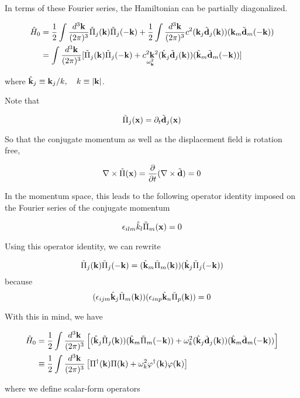 In terms of these Fourier series, the Hamiltonian can be partially diagonalized.

\[\begin{split}
\hat{H}_0 &= \frac{1}{2}\int\frac{d^3{\bf k}}{(2\pi)^3}\tilde{\Pi}_j({\bf k})\tilde{\Pi}_j({-\bf k}) + \frac{1}{2}\int\frac{d^3{\bf k}}{(2\pi)^3} c^2({\bf k}_j\tilde{\bf d}_j({\bf k}))({\bf k}_m\tilde{\bf d}_m(-{\bf k}))\\
&=\int\frac{d^3{\bf k}}{(2\pi)^3}[\tilde{\Pi}_j({\bf k})\tilde{\Pi}_j({-\bf k})+\underset{\omega_{\bf k}^2}{c^2{\bf k}^2}(\hat{\bf k}_j\tilde{\bf d}_j({\bf k}))(\hat{\bf k}_m\tilde{\bf d}_m(-{\bf k}))]
\end{split}\]

where $\hat{\bf k}_j \equiv {\bf k}_j/k,\quad k\equiv|\bf k|$.

Note that

\[\tilde{\Pi}_j({\bf x}) = \partial_t\tilde{\bf d}_j(\bf x) \]

So that the conjugate momentum as well as the displacement field is rotation free,

\[\nabla\times\tilde{\Pi}({\bf x}) = \frac{\partial}{\partial t}(\nabla\times\tilde{\bf d}) = 0 \]

In the momentum space, this leads to the following operator identity imposed on the Fourier series of the conjugate momentum

\[\epsilon_{ilm}\hat{k}_l\tilde{\Pi}_m({\bf x}) = 0 \]

Using this operator identity, we can rewrite

\[\tilde{\Pi}_j({\bf k})\tilde{\Pi}_j({\bf -k}) = (\hat{\bf k}_m\tilde{\Pi}_m({\bf k})) (\hat{\bf k}_j\tilde{\Pi}_j({\bf -k})) \]
because
\[(\epsilon_{ijm}\hat{\bf k}_j\tilde{\Pi}_m({\bf k}))(\epsilon_{inp}\hat{\bf k}_n\tilde{\Pi}_p({\bf k})) = 0 \]

With this in mind, we have

\[\begin{split}
\hat{H}_0 &=\frac{1}{2}\int\frac{d^3{\bf k}}{(2\pi)^3}\left[(\hat{\bf k}_j\tilde{\Pi}_j({\bf k})) (\hat{\bf k}_m\tilde{\Pi}_m({\bf -k})) + \omega_k^2 (\hat{\bf k}_j\tilde{\bf d}_j({\bf k}))(\hat{\bf k}_m\tilde{\bf d}_m(-{\bf k}))\right]\\
&\equiv \frac{1}{2}\int\frac{d^3{\bf k}}{(2\pi)^3}\left[\Pi^\dagger({\bf k})\Pi({\bf k}) + \omega_k^2\varphi^\dagger({\bf k})\varphi({\bf k})\right]
\end{split}\]

where we define scalar-form operators


